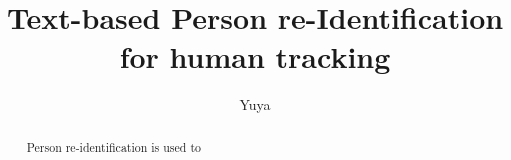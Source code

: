 \documentclass[mscthesis,english,oneside,biblatex,imlex]{template/uefcsthesis}
\title{Text-based Person re-Identification for human tracking} %
\author{Yuya}{Takagi} %
\date{\thismonth} %
\begin{document}
\maketitle

\begin{abstract}
Person re-identification is used to 
    
\end{abstract}

\frontmatter
\tableofcontents
\mainmatter



% 
% 

% 
% 
% 
% 

\appendix




\printnoidxglossaries

\printbibliography[heading=bibintoc]

\backmatter %
\end{document}
